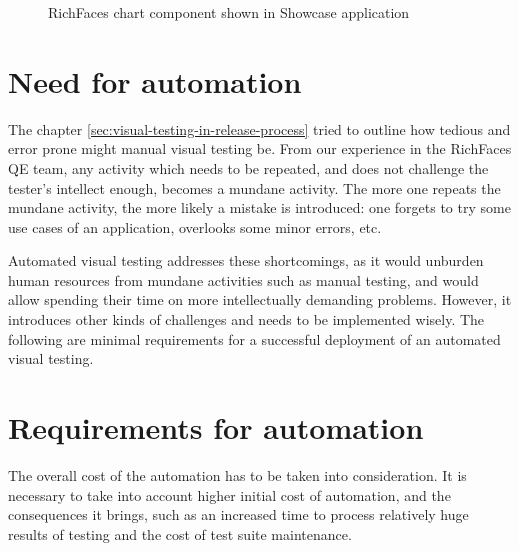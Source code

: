 \documentclass[11pt,oneside,final]{fithesis2}
\begin{document}
  \begin{figure}[!htb]
    \begin{center}
    \leavevmode
    \centerline{}
    \end{center}
    \caption{RichFaces chart component shown in Showcase application}
    \label{fig:richfaces_chart} 
  \end{figure}
  
  \section{Need for automation}
  The chapter \ref{sec:visual-testing-in-release-process} tried to outline how tedious and error prone might manual visual testing be. From our experience in the RichFaces QE team, any activity
  which needs to be repeated, and does not challenge the tester's intellect enough, becomes a mundane activity. The more one repeats the mundane activity, the more likely a mistake is introduced:
  one forgets to try some use cases of an application, overlooks some minor errors, etc.
  
  Automated visual testing addresses these shortcomings, as it would unburden human resources from mundane activities such as manual testing, and would allow spending their
  time on more intellectually demanding problems. However, it introduces other kinds of challenges and needs to be implemented wisely. The following are minimal requirements 
  for a successful deployment of an automated visual testing.
      
  \section{Requirements for automation}
  \label{sec:requirementsForAutomation}
  The overall cost of the automation has to be taken into consideration. It is necessary to take into account higher initial cost of automation, and the consequences it brings, 
  such as an increased time to process relatively huge results of testing and the cost of test suite maintenance.
  
\end{document}
